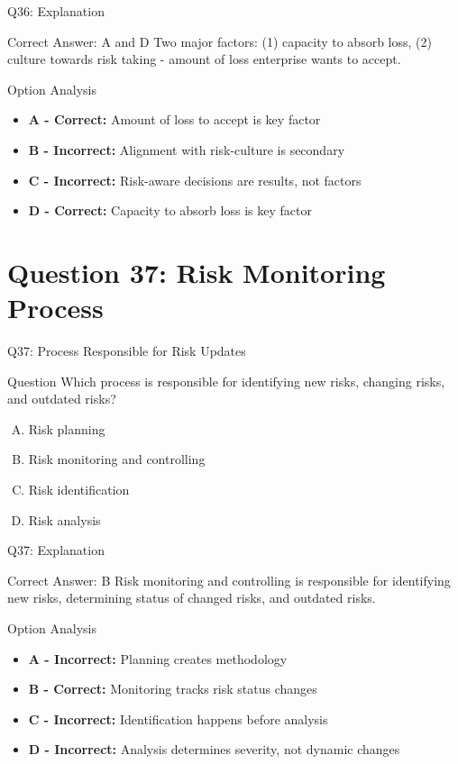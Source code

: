 \documentclass{beamer}
\begin{document}
	\begin{frame}{Q36: Explanation}
		\begin{block}{Correct Answer: A and D}
			Two major factors: (1) capacity to absorb loss, (2) culture towards risk taking - amount of loss enterprise wants to accept.
		\end{block}
		\begin{block}{Option Analysis}
			\begin{itemize}
				\item \textbf{A - Correct:} Amount of loss to accept is key factor
				\item \textbf{B - Incorrect:} Alignment with risk-culture is secondary
				\item \textbf{C - Incorrect:} Risk-aware decisions are results, not factors
				\item \textbf{D - Correct:} Capacity to absorb loss is key factor
			\end{itemize}
		\end{block}
	\end{frame}
	
	\section{Question 37: Risk Monitoring Process}
	
	\begin{frame}{Q37: Process Responsible for Risk Updates}
		\begin{block}{Question}
			Which process is responsible for identifying new risks, changing risks, and outdated risks?
		\end{block}
		\begin{enumerate}[(A)]
			\item Risk planning
			\item Risk monitoring and controlling
			\item Risk identification
			\item Risk analysis
		\end{enumerate}
	\end{frame}
	
	\begin{frame}{Q37: Explanation}
		\begin{block}{Correct Answer: B}
			Risk monitoring and controlling is responsible for identifying new risks, determining status of changed risks, and outdated risks.
		\end{block}
		\begin{block}{Option Analysis}
			\begin{itemize}
				\item \textbf{A - Incorrect:} Planning creates methodology
				\item \textbf{B - Correct:} Monitoring tracks risk status changes
				\item \textbf{C - Incorrect:} Identification happens before analysis
				\item \textbf{D - Incorrect:} Analysis determines severity, not dynamic changes
			\end{itemize}
		\end{block}
	\end{frame}
	
\end{document}
